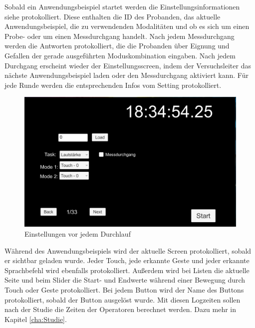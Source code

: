 Sobald ein Anwendungsbeispiel startet werden die Einstellungsinformationen siehe  protokolliert. 
Diese enthalten die ID des Probanden, das aktuelle Anwendungsbeispiel, die zu verwendenden Modalitäten und ob es sich um einen Probe- oder um einen Messdurchgang handelt. 
Nach jedem Messdurchgang werden die Antworten protokolliert, die die Probanden über Eignung und Gefallen der gerade ausgeführten Moduskombination eingaben.
Nach jedem Durchgang erscheint wieder der Einstellungsscreen, indem der Versuchsleiter das nächste Anwendungsbeispiel laden oder den Messdurchgang aktiviert kann. 
Für jede Runde werden die entsprechenden Infos vom Setting protokolliert.
\begin{figure}[ht]
  \centering
  \includegraphics[width=1\textwidth]{img/SettingsPrototyp.jpg}
  \caption{Einstellungen vor jedem Durchlauf}
  \label{fig:ProbandenSettings}
\end{figure} 

Während des Anwendungsbeispiels wird der aktuelle Screen protokolliert, sobald er sichtbar geladen wurde. 
Jeder Touch, jede erkannte Geste und jeder erkannte Sprachbefehl wird ebenfalls protokolliert. 
Außerdem wird bei Listen die aktuelle Seite und beim Slider die Start- und Endwerte während einer Bewegung durch Touch oder Geste protokolliert. 
Bei jedem Button wird der Name des Buttons protokolliert, sobald der Button ausgelöst wurde. 
Mit diesen Logzeiten sollen nach der Studie die Zeiten der Operatoren berechnet werden. 
Dazu mehr in Kapitel \ref{cha:Studie}.  
